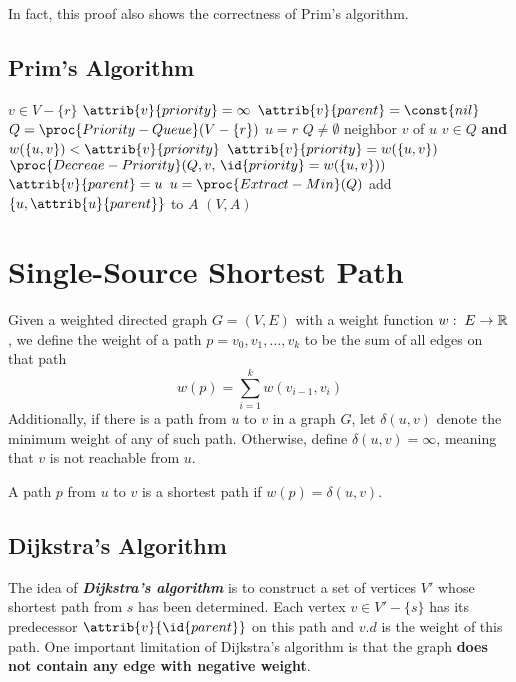 In fact, this proof also shows the correctness of Prim's algorithm.

\subsection{Prim's Algorithm} 

\begin{codebox}
    \li \For $v \in V - \{r\}$ \Do
        \li $\attrib{v}{priority} = \infty$
        \li $\attrib{v}{parent} = \const{nil}$ \End
    \li $Q = \proc{Priority-Queue}(V-\{r\})$
    \li $u = r$ 
    \li \While $Q \neq \emptyset$ \Do
        \li \For neighbor $v$ of $u$ \Do
            \li \If $v \in Q$ \textbf{and} $w(\{u,v\}) < \attrib{v}{priority}$ \Then
                \li $\attrib{v}{priority} = w(\{u,v\})$
                \li $\proc{Decreae-Priority}(Q,v,\, \id{priority}=w(\{u,v\}))$ 
                \li $\attrib{v}{parent} = u$ \End
            \End
        \li $u = \proc{Extract-Min}(Q)$
        \li add $\{u,\attrib{u}{parent}\}$ to $A$
        \End
    \li \Return $(V,A)$ 
\end{codebox}

\section{Single-Source Shortest Path}

Given a weighted directed graph $G=(V,E)$ with a weight function $w:\; E \to \mathbb{R}$, we define the weight of a path $p = v_0,v_1,\ldots,v_k$ to be the sum of all edges on that path
$$
w(p) = \sum_{i=1}^k w(v_{i-1},v_i)
$$
Additionally, if there is a path from $u$ to $v$ in a graph $G$, let $\delta(u,v)$ denote the minimum weight of any of such path. Otherwise, define $\delta(u,v) = \infty$, meaning that $v$ is not reachable from $u$. 

A path $p$ from $u$ to $v$ is a shortest path if $w(p) = \delta(u,v)$.

\subsection{Dijkstra's Algorithm} 

The idea of \textit{\textbf{Dijkstra's algorithm}} is to construct a set of vertices $V'$ whose shortest path from $s$ has been determined. Each vertex $v \in V' - \{s\}$ has its predecessor $\attrib{v}{\id{parent}}$ on this path and $v.d$ is the weight of this path. One important limitation of Dijkstra's algorithm is that the graph \textbf{does not contain any edge with negative weight}.

